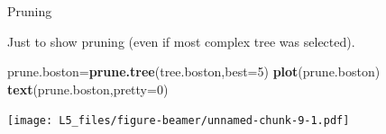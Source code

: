 \documentclass[
  ignorenonframetext,
]{beamer}
\newenvironment{Shaded}{\begin{snugshade}}{\end{snugshade}}
\newcommand{\DataTypeTok}[1]{\textcolor[rgb]{0.13,0.29,0.53}{#1}}
\newcommand{\DecValTok}[1]{\textcolor[rgb]{0.00,0.00,0.81}{#1}}
\newcommand{\KeywordTok}[1]{\textcolor[rgb]{0.13,0.29,0.53}{\textbf{#1}}}
\newcommand{\NormalTok}[1]{#1}
\begin{document}
\begin{frame}[fragile]

\begin{block}{Pruning}

Just to show pruning (even if most complex tree was selected).

\begin{Shaded}
\begin{Highlighting}[]
\NormalTok{prune.boston=}\KeywordTok{prune.tree}\NormalTok{(tree.boston,}\DataTypeTok{best=}\DecValTok{5}\NormalTok{)}
\KeywordTok{plot}\NormalTok{(prune.boston)}
\KeywordTok{text}\NormalTok{(prune.boston,}\DataTypeTok{pretty=}\DecValTok{0}\NormalTok{)}
\end{Highlighting}
\end{Shaded}

\texttt{[image: L5\_files/figure-beamer/unnamed-chunk-9-1.pdf]}

\end{block}

\end{frame}
\end{document}
